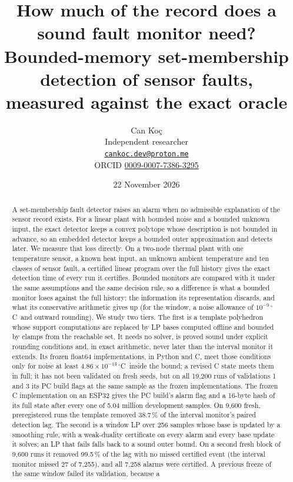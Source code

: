 \documentclass[11pt,a4paper]{article}
\title{How much of the record does a sound fault monitor need?\\[2pt]
\large Bounded-memory set-membership detection of sensor faults, measured against the exact oracle}
\author{Can Ko\c{c}\\ Independent researcher\\ \small \href{mailto:cankoc.dev@proton.me}{\texttt{cankoc.dev@proton.me}}\\
\small ORCID \href{https://orcid.org/0009-0007-7386-3295}{0009-0007-7386-3295}}
\date{22 November 2026}
\newcommand{\degC}{\ensuremath{{}^\circ}C}
\begin{document}
\maketitle

\begin{abstract}
A set-membership fault detector raises an alarm when no admissible explanation of the sensor record exists. For a
linear plant with bounded noise and a bounded unknown input, the exact detector keeps a convex polytope whose
description is not bounded in advance, so an embedded detector keeps a bounded outer approximation and detects later.
We measure that loss directly. On a two-node thermal plant with one temperature sensor, a known heat input, an unknown
ambient temperature and ten classes of sensor fault, a certified linear program over the full history gives the exact
detection time of every run it certifies. Bounded monitors are compared with it under the same assumptions and the same decision
rule, so a difference is what a bounded monitor loses against the full history: the information its representation
discards, and what its conservative arithmetic gives up (for the window, a noise allowance of $10^{-9}$\,\degC\ and
outward rounding). We study two tiers. The first is a
template polyhedron whose support computations are replaced by LP bases computed offline and bounded by clamps from
the reachable set. It needs no solver, is proved sound under explicit rounding conditions and, in exact arithmetic,
never later than the interval monitor it extends. Its frozen float64 implementations, in Python and C, meet those
conditions only
for noise at least $4.86\times10^{-13}$\,\degC\ inside the bound; a revised C state meets them in full; it has not
been validated on fresh seeds, but on all 19,200 runs of validations 1 and 3 its PC build flags at the same sample as
the frozen implementations. The frozen C implementation on an ESP32 gives the PC build's alarm flag and a 16-byte
hash of its full state after every one of 5.04 million development samples. On 9,600 fresh,
preregistered runs the template removed 38.7\,\% of the interval monitor's paired detection lag. The second is a window LP over
256 samples whose base is updated by a smoothing rule, with a weak-duality certificate on every alarm and every base
update it solves; an LP that fails falls back to a sound outer bound. On a second fresh block of 9,600 runs it removed 99.5\,\% of the lag with no missed certified event (the interval monitor
missed 27 of 7,255), and all 7,258 alarms were certified. A previous freeze of the same window failed its validation, because a

\end{abstract}
\end{document}
